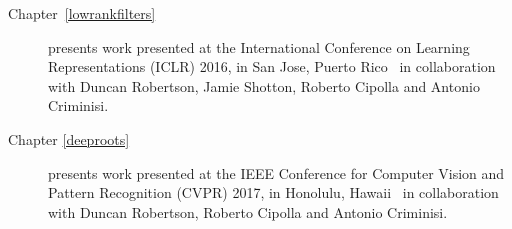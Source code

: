 \begin{acknowledgements}
\begin{description}
	\item[Chapter~\ref{lowrankfilters}] presents work presented at the International Conference on Learning Representations (ICLR) 2016, in San Jose, Puerto Rico~\cite{Ioannou2016} in collaboration with Duncan Robertson, Jamie Shotton, Roberto Cipolla and Antonio Criminisi.

	\item[Chapter \ref{deeproots}] presents work presented at the IEEE Conference for Computer Vision and Pattern Recognition (CVPR) 2017, in Honolulu, Hawaii~\cite{ioannou2016deep} in collaboration with Duncan Robertson, Roberto Cipolla and Antonio Criminisi.
\end{description}


\end{acknowledgements}
